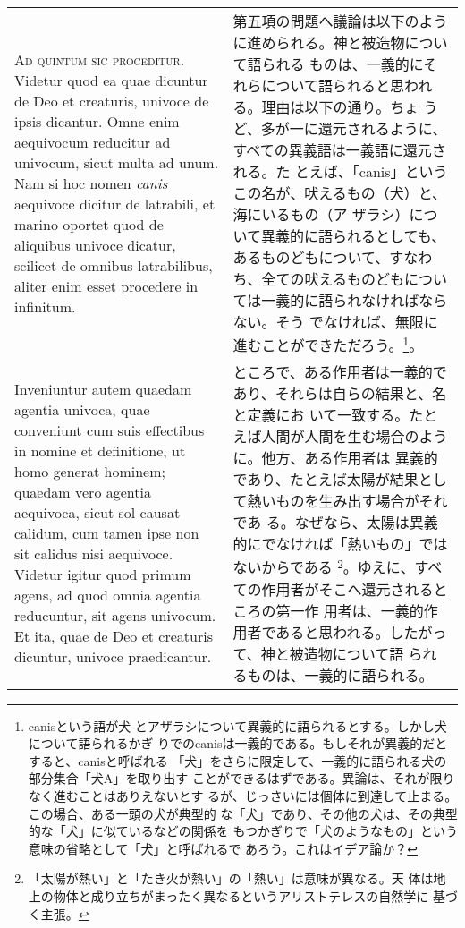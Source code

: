 \documentclass[paper=a4paper,fontsize=10pt,jafontsize=9pt,titlepage]{jlreq}
\begin{document}
\begin{longtable}{p{21em}p{21em}}

{\scshape Ad quintum sic proceditur}. Videtur quod ea quae dicuntur de Deo
et creaturis, univoce de ipsis dicantur. Omne enim aequivocum
reducitur ad univocum, sicut multa ad unum. Nam si hoc nomen {\itshape
canis} aequivoce dicitur de latrabili,
et marino
oportet quod de aliquibus univoce dicatur, scilicet de omnibus
latrabilibus, aliter enim esset procedere in infinitum.

&

第五項の問題へ議論は以下のように進められる。神と被造物について語られる
ものは、一義的にそれらについて語られると思われる。理由は以下の通り。ちょ
うど、多が一に還元されるように、すべての異義語は一義語に還元される。た
とえば、「canis」というこの名が、吠えるもの（犬）と、海にいるもの（ア
ザラシ）について異義的に語られるとしても、あるものどもについて、すなわ
ち、全ての吠えるものどもについては一義的に語られなければならない。そう
でなければ、無限に進むことができただろう。\footnote{canisという語が犬
とアザラシについて異義的に語られるとする。しかし犬について語られるかぎ
りでのcanisは一義的である。もしそれが異義的だとすると、canisと呼ばれる
「犬」をさらに限定して、一義的に語られる犬の部分集合「犬A」を取り出す
ことができるはずである。異論は、それが限りなく進むことはありえないとす
るが、じっさいには個体に到達して止まる。この場合、ある一頭の犬が典型的
な「犬」であり、その他の犬は、その典型的な「犬」に似ているなどの関係を
もつかぎりで「犬のようなもの」という意味の省略として「犬」と呼ばれるで
あろう。これはイデア論か？}。

\\

Inveniuntur autem quaedam agentia univoca, quae conveniunt cum suis
effectibus in nomine et definitione, ut homo generat hominem; quaedam
vero agentia aequivoca, sicut sol causat calidum, cum tamen ipse non
sit calidus nisi aequivoce. Videtur igitur quod primum agens, ad quod
omnia agentia reducuntur, sit agens univocum. Et ita, quae de Deo et
creaturis dicuntur, univoce praedicantur.

&

ところで、ある作用者は一義的であり、それらは自らの結果と、名と定義にお
いて一致する。たとえば人間が人間を生む場合のように。他方、ある作用者は
異義的であり、たとえば太陽が結果として熱いものを生み出す場合がそれであ
る。なぜなら、太陽は異義的にでなければ「熱いもの」ではないからである
\footnote{「太陽が熱い」と「たき火が熱い」の「熱い」は意味が異なる。天
体は地上の物体と成り立ちがまったく異なるというアリストテレスの自然学に
基づく主張。}。ゆえに、すべての作用者がそこへ還元されるところの第一作
用者は、一義的作用者であると思われる。したがって、神と被造物について語
られるものは、一義的に語られる。


\end{longtable}
\end{document}
